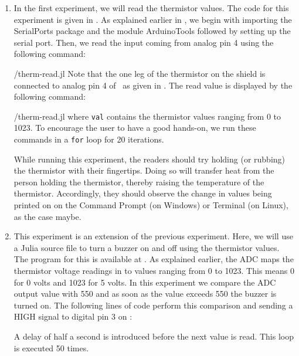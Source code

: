 \begin{enumerate}
  \item In the first experiment, we will read the thermistor values.
        The code for this experiment is given in
        . As explained earlier in , we begin with importing the SerialPorts
        \cite{julia-serial-ports} package and the module ArduinoTools followed by setting up the serial port.
        Then, we read the input coming from analog pin 4 using the
        following command:
        
        {\LocTHERMjuliacode/therm-read.jl} Note that the one leg of the thermistor on
        the shield is connected to analog pin 4 of \arduino\,
        as given in . The read value is displayed
        by the following command:
        
        {\LocTHERMjuliacode/therm-read.jl} where {\tt val} contains
        the thermistor values ranging from 0 to 1023. To
        encourage the user to have a good hands-on, we run these commands in
        a {\tt for} loop for 20 iterations.

        While running this experiment,
        the readers should try holding (or rubbing) the thermistor with their fingertips.
        Doing so will transfer heat from the person holding the
        thermistor, thereby raising the temperature of the thermistor.
        Accordingly, they should observe the change in values being printed on on the
        Command Prompt (on Windows) or Terminal (on Linux), as the case maybe.

  \item This experiment is an extension of the previous
        experiment. Here, we will use a Julia source file to
        turn a buzzer on and off using the thermistor values.
        The program for this is available at
        .  As explained earlier,
        the ADC maps the thermistor voltage readings in to values
        ranging from 0 to 1023. This means 0 for 0 volts and 1023 for 5
        volts. In this experiment we compare the ADC output value with 550
        and as soon as the value exceeds 550 the buzzer is turned on. The following lines of code perform this
        comparison and sending a {HIGH} signal to digital pin 3 on \arduino:
        
        A delay of half a second is introduced
        before the next value is read. This loop is executed 50 times.


\end{enumerate}

